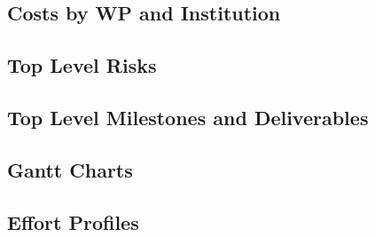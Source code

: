 \subsection{Costs by WP and Institution}
\label{app:A}

\newpage

\subsection{Top Level Risks}

\newpage

\subsection{Top Level Milestones and Deliverables}

\newpage

\subsection{Gantt Charts}

\newpage

\subsection{Effort Profiles}

\newpage


